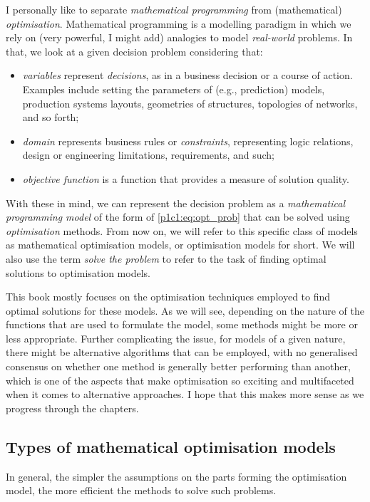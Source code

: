 I personally like to separate \emph{mathematical programming} from (mathematical) \emph{optimisation}. Mathematical programming is a modelling paradigm in which we rely on (very powerful, I might add) analogies to model \emph{real-world} problems. In that, we look at a given decision problem considering that:
%
\begin{itemize}
    \item \emph{variables} represent \emph{decisions}, as in a business decision or a course of action. Examples include setting the parameters of (e.g., prediction) models, production systems layouts, geometries of structures, topologies of networks, and so forth; 
    \item \emph{domain} represents business rules or \emph{constraints}, representing logic relations, design or engineering limitations, requirements, and such; 
    \item \emph{objective function} is a function that provides a measure of solution quality.  
\end{itemize}
%    
With these in mind, we can represent the decision problem as a \emph{mathematical programming model} of the form of \eqref{p1c1:eq:opt_prob} that can be solved using \emph{optimisation} methods. From now on, we will refer to this specific class of models as mathematical optimisation models, or optimisation models for short. We will also use the term \emph{solve the problem} to refer to the task of finding optimal solutions to optimisation models.

This book mostly focuses on the optimisation techniques employed to find optimal solutions for these models. As we will see, depending on the nature of the functions that are used to formulate the model, some methods might be more or less appropriate. Further complicating the issue, for models of a given nature, there might be alternative algorithms that can be employed, with no generalised consensus on whether one method is generally better performing than another, which is one of the aspects that make optimisation so exciting and multifaceted when it comes to alternative approaches. I hope that this makes more sense as we progress through the chapters. 


\subsection{Types of mathematical optimisation models}

In general, the simpler the assumptions on the parts forming the optimisation model, the more efficient the methods to solve such problems. 

